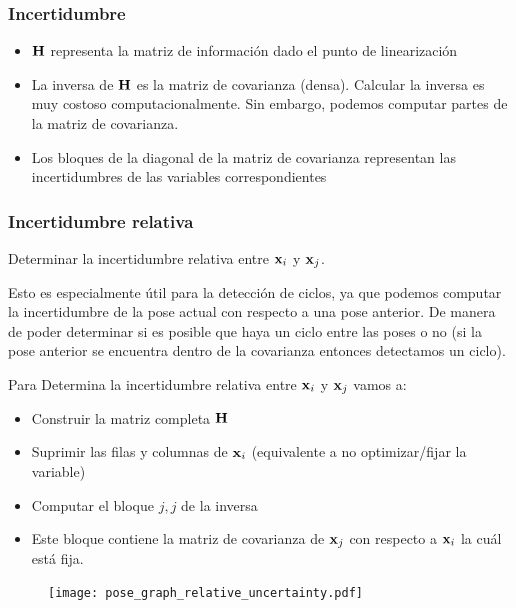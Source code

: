 \begin{frame}
    \frametitle{Incertidumbre}
    
    \begin{itemize}
        \item $\boldsymbol{\mathbf{H}}$ representa la matriz de información dado el punto de linearización
        \item La inversa de $\boldsymbol{\mathbf{H}}$ es la matriz de covarianza (densa). Calcular la inversa es muy costoso computacionalmente. Sin embargo, podemos computar partes de la matriz de covarianza.
        \item Los bloques de la diagonal de la matriz de covarianza representan las incertidumbres de las variables correspondientes
    \end{itemize}
\end{frame}

\begin{frame}
    \frametitle{Incertidumbre relativa}
    
    Determinar la incertidumbre relativa entre $\boldsymbol{\mathbf{x}}_{i}$ y $\boldsymbol{\mathbf{x}}_{j}$.
    
    Esto es especialmente útil para la detección de ciclos, ya que podemos computar la incertidumbre de la pose actual con respecto a una pose anterior. De manera de poder determinar si es posible que haya un ciclo entre las poses o no (si la pose anterior se encuentra dentro de la covarianza entonces detectamos un ciclo).
    
    Para Determina la incertidumbre relativa entre $\boldsymbol{\mathbf{x}}_{i}$ y $\boldsymbol{\mathbf{x}}_{j}$ vamos a:    
    \begin{itemize}
        \item Construir la matriz completa $\boldsymbol{\mathbf{H}}$
        \item Suprimir las filas y columnas de $\boldsymbol{\mathbf{x}}_{i}$ (equivalente a no optimizar/fijar la variable)
        \item Computar el bloque $j,j$ de la inversa
        \item Este bloque contiene la matriz de covarianza de $\boldsymbol{\mathbf{x}}_{j}$ con respecto a $\boldsymbol{\mathbf{x}}_{i}$ la cuál está fija.
    \end{itemize}

    \begin{figure}[!h]
        \texttt{[image: pose\_graph\_relative\_uncertainty.pdf]}
    \end{figure}
    
\end{frame}

